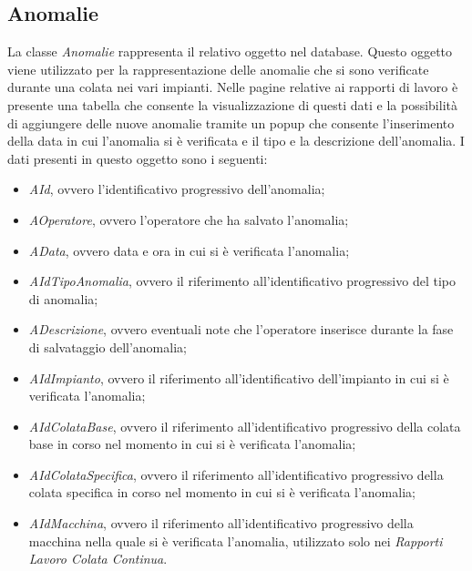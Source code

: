   \subsection{Anomalie}
  La classe \textit{Anomalie} rappresenta il relativo oggetto nel database. Questo oggetto viene utilizzato per la
  rappresentazione delle anomalie che si sono verificate durante una colata nei vari impianti. Nelle pagine relative
  ai rapporti di lavoro è presente una tabella che consente la visualizzazione di questi dati e la possibilità di aggiungere
  delle nuove anomalie tramite un popup che consente l'inserimento della data in cui l'anomalia si è verificata e 
  il tipo e la descrizione dell'anomalia. I dati presenti in questo oggetto sono i seguenti:
  \begin{itemize}
    \item \textit{AId}, ovvero l'identificativo progressivo dell'anomalia;
    \item \textit{AOperatore}, ovvero l'operatore che ha salvato l'anomalia;
    \item \textit{AData}, ovvero data e ora in cui si è verificata l'anomalia;
    \item \textit{AIdTipoAnomalia}, ovvero il riferimento all'identificativo progressivo del tipo di anomalia;
    \item \textit{ADescrizione}, ovvero eventuali note che l'operatore inserisce durante la fase di salvataggio dell'anomalia;
    \item \textit{AIdImpianto}, ovvero il riferimento all'identificativo dell'impianto in cui si è verificata l'anomalia;
    \item \textit{AIdColataBase}, ovvero il riferimento all'identificativo progressivo della colata base in corso
    nel momento in cui si è verificata l'anomalia;
    \item \textit{AIdColataSpecifica}, ovvero il riferimento all'identificativo progressivo della colata specifica
    in corso nel momento in cui si è verificata l'anomalia;
    \item \textit{AIdMacchina}, ovvero il riferimento all'identificativo progressivo della macchina nella quale
    si è verificata l'anomalia, utilizzato solo nei \textit{Rapporti Lavoro Colata Continua}.
  \end{itemize}
    

